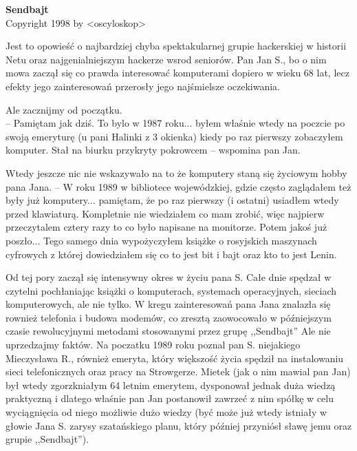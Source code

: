 \documentclass[a4paper,polish,titlepage,12pt]{article}
\begin{document}
\begin{titlepage}
\begin{center}
{\Huge\bf Sendbajt}\\
\vspace{2cm}
{\small Copyright 1998 by <oscyloskop>}
\end{center}
\end{titlepage}

Jest to opowieść o najbardziej chyba spektakularnej grupie hackerskiej w historii Netu oraz najgenialniejszym hackerze wsrod seniorów. Pan Jan S., bo o nim mowa zaczął się co prawda interesować komputerami dopiero w wieku 68 lat, lecz efekty jego zainteresowań przerosły jego najśmielsze oczekiwania.

Ale zacznijmy od początku.\\
-- Pamiętam jak dziś. To bylo w 1987 roku... byłem właśnie wtedy na poczcie po swoją emeryturę (u pani Halinki z 3 okienka) kiedy po raz pierwszy zobaczyłem komputer. Stał na biurku przykryty pokrowcem -- wspomina pan Jan.

Wtedy jeszcze nic nie wskazywało na to że komputery staną się życiowym hobby pana Jana.
-- W roku 1989 w bibliotece wojewódzkiej, gdzie często zaglądałem też były już komputery... pamiętam, że po raz pierwszy (i ostatni) usiadłem wtedy przed klawiaturą. Kompletnie nie wiedziałem co mam zrobić, więc najpierw przeczytalem cztery razy to co było napisane na monitorze. Potem jakoś już poszło... Tego samego dnia wypożyczyłem książke o rosyjskich maszynach cyfrowych z której dowiedziałem się co to jest bit i bajt oraz kto to jest Lenin.

Od tej pory zaczął się intensywny okres w życiu pana S. Całe dnie spędzał w czytelni pochłaniając książki o komputerach, systemach operacyjnych, sieciach komputerowych, ale nie tylko. 
W kregu zainteresowań pana Jana znalazła się rownież telefonia i budowa modemów, co zresztą zaowocowało w późniejszym czasie rewolucyjnymi metodami stosowanymi przez grupę 
,,Sendbajt'' Ale nie uprzedzajmy faktów. Na poczatku 1989 roku poznal pan S. niejakiego Mieczysława R., również emeryta, który większość życia spędził na instalowaniu sieci 
telefonicznych oraz pracy na Strowgerze. Mietek (jak o nim mawial pan Jan) był wtedy zgorzkniałym 64 letnim emerytem, dysponował jednak duża wiedzą praktyczną i dlatego 
właśnie pan Jan postanowił zawrzeć z nim spółkę w celu wyciągnięcia od niego możliwie dużo wiedzy (być może już wtedy istniały w głowie Jana S. zarysy szatańskiego planu, 
który później przyniósł sławę jemu oraz grupie ,,Sendbajt'').
\end{document}
